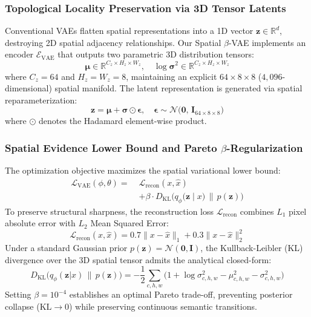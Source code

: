 \documentclass[journal]{IEEEtran}
\begin{document}
\subsubsection{Topological Locality Preservation via 3D Tensor Latents}
Conventional VAEs flatten spatial representations into a 1D vector $\mathbf{z} \in \mathbb{R}^d$, destroying 2D spatial adjacency relationships. Our Spatial $\beta$-VAE implements an encoder $\mathcal{E}_{\text{VAE}}$ that outputs two parametric 3D distribution tensors:
\begin{equation}
\bm{\mu} \in \mathbb{R}^{C_z \times H_z \times W_z}, \quad \log \bm{\sigma}^2 \in \mathbb{R}^{C_z \times H_z \times W_z}
\end{equation}
where $C_z = 64$ and $H_z = W_z = 8$, maintaining an explicit $64 \times 8 \times 8$ ($4,096$-dimensional) spatial manifold. The latent representation is generated via spatial reparameterization:
\begin{equation}
\mathbf{z} = \bm{\mu} + \bm{\sigma} \odot \bm{\epsilon}, \quad \bm{\epsilon} \sim \mathcal{N}\big(\mathbf{0},\, \mathbf{I}_{64 \times 8 \times 8}\big)
\label{eq:spatial_reparam}
\end{equation}
where $\odot$ denotes the Hadamard element-wise product.

\subsubsection{Spatial Evidence Lower Bound and Pareto $\beta$-Regularization}
The optimization objective maximizes the spatial variational lower bound:
\begin{align}
\mathcal{L}_{\text{VAE}}(\phi, \theta) = \;& \mathcal{L}_{\text{recon}}(x, \hat{x}) \nonumber \\
& + \beta \cdot D_{\text{KL}}\Big(q_\phi\big(\mathbf{z} \mid x\big) \,\Big\|\, p(\mathbf{z})\Big)
\label{eq:vae_elbo}
\end{align}
To preserve structural sharpness, the reconstruction loss $\mathcal{L}_{\text{recon}}$ combines $L_1$ pixel absolute error with $L_2$ Mean Squared Error:
\begin{equation}
\mathcal{L}_{\text{recon}}(x, \hat{x}) = 0.7 \|x - \hat{x}\|_1 + 0.3 \|x - \hat{x}\|_2^2
\label{eq:vae_recon}
\end{equation}
Under a standard Gaussian prior $p(\mathbf{z}) = \mathcal{N}(\mathbf{0}, \mathbf{I})$, the Kullback-Leibler (KL) divergence over the 3D spatial tensor admits the analytical closed-form:
\begin{equation}
D_{\text{KL}}\big(q_\phi(\mathbf{z}|x) \,\|\, p(\mathbf{z})\big) = -\frac{1}{2} \sum_{c, h, w} \Big(1 + \log \sigma_{c,h,w}^2 - \mu_{c,h,w}^2 - \sigma_{c,h,w}^2\Big)
\label{eq:kl_div}
\end{equation}
Setting $\beta = 10^{-4}$ establishes an optimal Pareto trade-off, preventing posterior collapse ($\text{KL} \to 0$) while preserving continuous semantic transitions.
\end{document}
